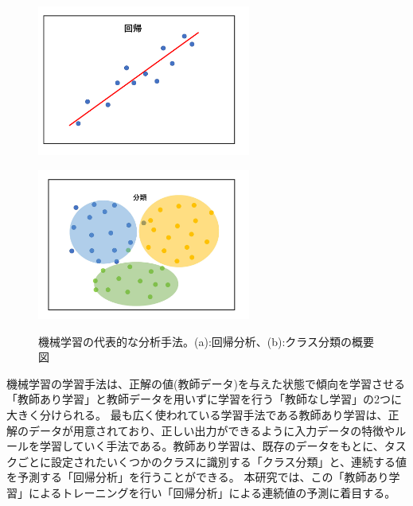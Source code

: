 \begin{figure}[tb]
  \centering
    \begin{minipage}[b]{0.4\linewidth}
        \centering
        \includegraphics[clip, width=7cm]{fig/4/regression.pdf}
        \hspace{-1cm}
        \subcaption{}
        \label{fig:regre}
    \end{minipage}
    \hfill
    \begin{minipage}[b]{0.4\linewidth}
        \centering
        \includegraphics[clip, width=7cm]{fig/4/classification.pdf}
        \hspace{-1cm}
        \subcaption{}
        \label{fig:class}
    \end{minipage}
  \caption{機械学習の代表的な分析手法。(a):回帰分析、(b):クラス分類の概要図}
  \label{fig:fit_def}
\end{figure}

機械学習の学習手法は、正解の値(教師データ)を与えた状態で傾向を学習させる「教師あり学習」と教師データを用いずに学習を行う「教師なし学習」の2つに大きく分けられる。
最も広く使われている学習手法である教師あり学習は、正解のデータが用意されており、正しい出力ができるように入力データの特徴やルールを学習していく手法である。教師あり学習は、既存のデータをもとに、タスクごとに設定されたいくつかのクラスに識別する「クラス分類」と、連続する値を予測する「回帰分析」を行うことができる。
本研究では、この「教師あり学習」によるトレーニングを行い「回帰分析」による連続値の予測に着目する。

